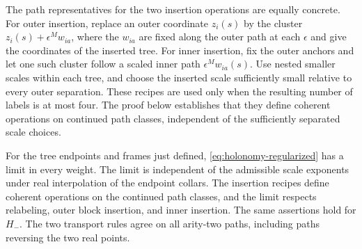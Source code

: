 The path representatives for the two insertion operations are equally
concrete.  For outer insertion, replace an outer coordinate $z_i(s)$
by the cluster $z_i(s)+\epsilon^M w_{ia}$, where the $w_{ia}$ are fixed
along the outer path at each $\epsilon$ and give the coordinates of
the inserted tree.  For inner insertion, fix the outer
anchors and let one such cluster follow a scaled inner path
$\epsilon^M w_{ia}(s)$.  Use nested smaller scales within each tree,
and choose the inserted scale sufficiently small relative to every
outer separation.  These recipes are used only when the resulting
number of labels is at most four.  The proof below establishes that
they define coherent operations on continued path classes, independent
of the sufficiently separated scale choices.

\begin{proposition}\label{prop:regularized-holonomy}
For the tree endpoints and frames just defined,
\eqref{eq:holonomy-regularized} has a limit in every weight.
The limit is independent of the admissible scale exponents under
real interpolation of the endpoint collars.  The insertion recipes
define coherent operations on the continued path classes, and the
limit respects relabeling, outer block insertion, and inner insertion.
The same assertions hold for $H_-$.  The two transport rules agree
on all arity-two paths, including paths reversing the two real points.
\end{proposition}

